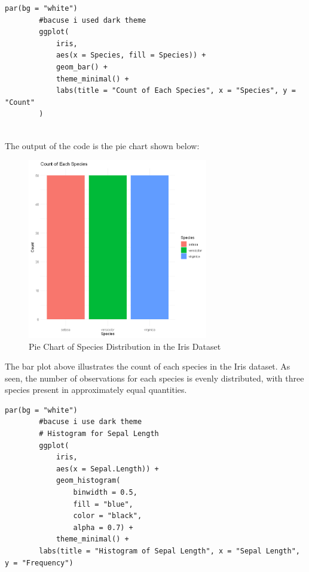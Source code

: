 \documentclass[a4paper,12pt]{article}
\begin{document}
    \begin{lstlisting}[style=RStyle]
        par(bg = "white")                          
        #bacuse i used dark theme
        ggplot(
            iris,
            aes(x = Species, fill = Species)) +
            geom_bar() +
            theme_minimal() +
            labs(title = "Count of Each Species", x = "Species", y = "Count"
        )
        
    \end{lstlisting}
        
    The output of the code is the pie chart shown below:
    
    \begin{figure}[h]
        \includegraphics[width=0.7\textwidth]{Images/02.png}
        \caption{Pie Chart of Species Distribution in the Iris Dataset}
        \label{fig:pie_chart}
    \end{figure}
    The bar plot above illustrates the count of each species in the Iris dataset. As seen, the number of observations for each species is evenly distributed, with three species present in approximately equal quantities.

    \newpage

    \begin{lstlisting}[style=RStyle]
        par(bg = "white")                          
        #bacuse i use dark theme
        # Histogram for Sepal Length
        ggplot(
            iris,
            aes(x = Sepal.Length)) +
            geom_histogram(
                binwidth = 0.5,
                fill = "blue",
                color = "black",
                alpha = 0.7) +
            theme_minimal() +
        labs(title = "Histogram of Sepal Length", x = "Sepal Length", y = "Frequency")
        
    \end{lstlisting}
        
\end{document}
